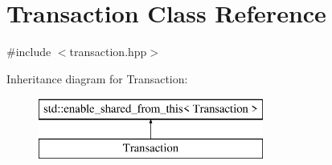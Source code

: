 \hypertarget{classTransaction}{}\section{Transaction Class Reference}
\label{classTransaction}


{\ttfamily \#include $<$transaction.\+hpp$>$}

Inheritance diagram for Transaction\+:\begin{figure}[H]
\begin{center}
\leavevmode
\includegraphics[height=2.000000cm]{classTransaction}
\end{center}
\end{figure}
